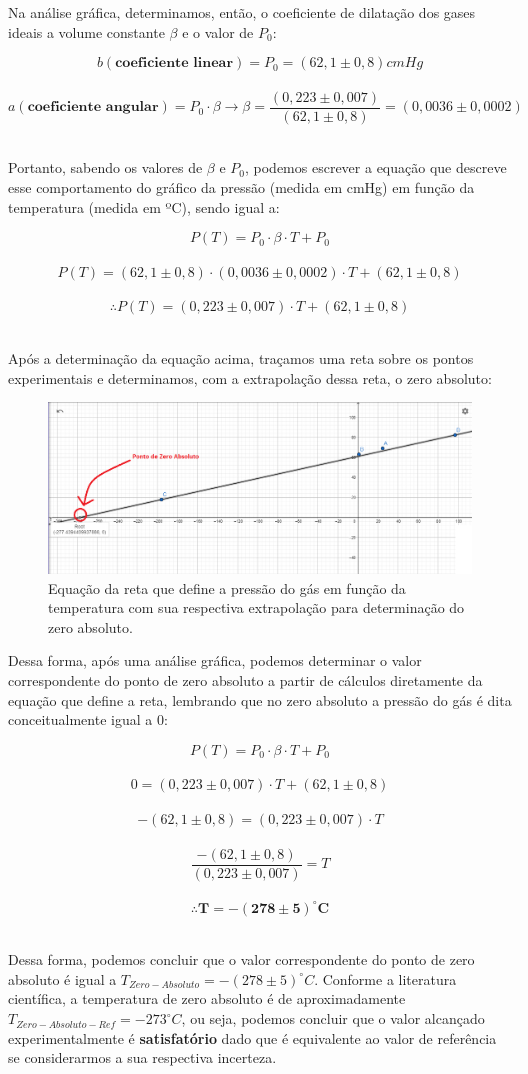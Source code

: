 Na análise gráfica, determinamos, então, o coeficiente de dilatação dos gases ideais a volume constante $\beta$ e o valor de $P_0$:

\[ b (\textbf{coeficiente linear}) = P_0 = (62,1 \pm 0,8) cmHg\]\
\[ a (\textbf{coeficiente angular}) = P_0 \cdot \beta \longrightarrow \beta = \frac{(0,223 \pm 0,007)}{(62,1 \pm 0,8)} = (0,0036 \pm 0,0002) \]\

Portanto, sabendo os valores de $\beta$ e $P_0$, podemos escrever a equação que descreve esse comportamento do gráfico da pressão (medida em cmHg) em função da temperatura (medida em ºC), sendo igual a:

\[ P(T) = P_0 \cdot \beta \cdot T + P_0 \]\
\[ P(T) = (62,1 \pm 0,8) \cdot (0,0036 \pm 0,0002) \cdot T + (62,1 \pm 0,8) \]\
\[ \therefore P(T) = (0,223 \pm 0,007) \cdot T + (62,1 \pm 0,8) \]\

Após a determinação da equação acima, traçamos uma reta sobre os pontos experimentais e determinamos, com a extrapolação dessa reta, o zero absoluto:

\begin{figure}[H]
  \centering
  \includegraphics[scale=0.45]{images/Gráfico 3 - experimento 3.png}
  \caption{Equação da reta que define a pressão do gás em função da temperatura com sua respectiva extrapolação para determinação do zero absoluto.}
\end{figure}

Dessa forma, após uma análise gráfica, podemos determinar o valor correspondente do ponto de zero absoluto a partir de cálculos diretamente da equação que define a reta, lembrando que no zero absoluto a pressão do gás é dita conceitualmente igual a 0: 

\[ P(T) = P_0 \cdot \beta \cdot T + P_0 \]\
\[ 0 = (0,223 \pm 0,007) \cdot T + (62,1 \pm 0,8) \]\
\[ -(62,1 \pm 0,8) = (0,223 \pm 0,007) \cdot T  \]\
\[ \frac{-(62,1 \pm 0,8)}{(0,223 \pm 0,007)}  =  T  \]\
\[ \therefore \mathbf{T = -(278 \pm 5) ^\circ C} \]\

Dessa forma, podemos concluir que o valor correspondente do ponto de zero absoluto é igual a $T_{Zero-Absoluto}= -(278 \pm 5) ^\circ C$. Conforme a literatura científica, a temperatura de zero absoluto é de aproximadamente $T_{Zero-Absoluto-Ref}= -273 ^\circ C$, ou seja, podemos concluir que o valor alcançado experimentalmente é \textbf{satisfatório} dado que é equivalente ao valor de referência se considerarmos a sua respectiva incerteza.
